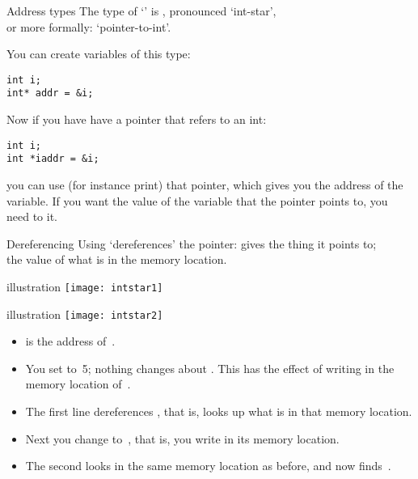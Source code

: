 \begin{block}{Address types}
  \label{sl:intstar}
  The type of `' is , pronounced `int-star',\\
  or more
  formally: `pointer-to-int'.

  You can create variables of this type:
\begin{verbatim}
int i;
int* addr = &i;
\end{verbatim}
\end{block}

Now if you have have a pointer that refers to an int:
\begin{verbatim}
int i;
int *iaddr = &i;
\end{verbatim}
you can use (for instance print) that pointer, which gives you the
address of the variable. If you want the value of the variable that
the pointer points to, you need to  it.

\begin{block}{Dereferencing}
  \label{sl:starderef}
  Using  `dereferences' the pointer: gives the thing it
  points to;\\
  the value of what
  is in the memory location.
\end{block}

\begin{block}{illustration}
  \label{sl:copy-pic}
  \texttt{[image: intstar1]}
\end{block}

\begin{block}{illustration}
  \label{sl:deref-pic}
  \texttt{[image: intstar2]}
\end{block}

\begin{itemize}
\item {} is the address of~.
\item You set  to~5; nothing changes about . This has the
  effect of writing  in the memory location of~.
\item The first  line dereferences , that is, looks up
  what is in that memory location.
\item Next you change  to~, that is, you write  in its
  memory location.
\item The second  looks in the same memory location as before,
  and now finds~.
\end{itemize}

